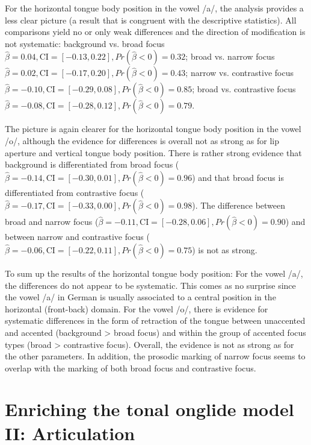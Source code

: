 For the horizontal tongue body position in the vowel /a/, the analysis provides a less clear picture (a result that is congruent with the descriptive statistics). All comparisons yield no or only weak differences and the direction of modification is not systematic: background vs. broad focus $\hat\beta=0.04 , \text{CI}=[-0.13, 0.22], \allowbreak Pr(\hat\beta<0)=0.32$; broad vs. narrow focus $\hat\beta=0.02 , \text{CI}=[-0.17, 0.20], \allowbreak Pr(\hat\beta<0)=0.43$; narrow vs. contrastive focus $\hat\beta=-0.10 , \text{CI}=[-0.29, 0.08], \allowbreak Pr(\hat\beta<0)=0.85$; broad vs. contrastive focus $\hat\beta=-0.08 , \text{CI}=[-0.28, 0.12], \allowbreak Pr(\hat\beta<0)=0.79$.

The picture is again clearer for the horizontal tongue body position in the vowel /o/, although the evidence for differences is overall not as strong as for lip aperture and vertical tongue body position. There is rather strong evidence that background is differentiated from broad focus  ($\hat\beta=-0.14, \text{CI}=[-0.30, 0.01], \allowbreak Pr(\hat\beta<0)=0.96$) and that broad focus is differentiated from contrastive focus ($\hat\beta=-0.17 , \text{CI}=[-0.33, 0.00], \allowbreak Pr(\hat\beta<0)=0.98$). The difference between broad and narrow focus ($\hat\beta=-0.11 , \text{CI}=[-0.28, 0.06], \allowbreak Pr(\hat\beta<0)=0.90$) and between narrow and contrastive focus ($\hat\beta=-0.06 , \text{CI}=[-0.22, 0.11], \allowbreak Pr(\hat\beta<0)=0.75$) is not as strong.

To sum up the results of the horizontal tongue body position: For the vowel /a/, the differences do not appear to be systematic. This comes as no surprise since the vowel /a/ in German is usually associated to a central position in the horizontal (front-back) domain. For the vowel /o/, there is evidence for systematic differences in the form of retraction of the tongue between unaccented and accented (background > broad focus) and within the group of accented focus types (broad > contrastive focus). Overall, the evidence is not as strong as for the other parameters. In addition, the prosodic marking of narrow focus seems to overlap with the marking of both broad focus and contrastive focus.

\section{Enriching the tonal onglide model II: Articulation}

